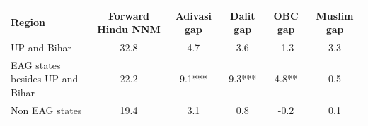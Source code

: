 \begin{tabular}{lccccc}
\hline
Region & Forward Hindu NNM & Adivasi gap & Dalit gap & OBC gap & Muslim gap \\
\hline
UP and Bihar&32.8&4.7&3.6&-1.3&3.3\\
EAG states besides UP and Bihar&22.2&9.1***&9.3***&4.8**&0.5\\
Non EAG states&19.4&3.1&0.8&-0.2&0.1\\
\hline
\end{tabular}
